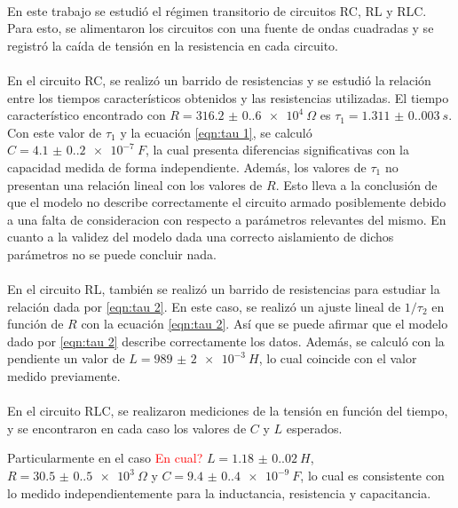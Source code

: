 \paragraph{}
En este trabajo se estudió el régimen transitorio de circuitos RC, RL y RLC. Para esto, se alimentaron los circuitos con una fuente de ondas cuadradas y se registró la caída de tensión en la resistencia en cada circuito.
\paragraph{}
En el circuito RC, se realizó un barrido de resistencias y se estudió la relación entre los tiempos característicos obtenidos y las resistencias utilizadas. El tiempo característico encontrado con $R=\SI{316.2(0.6)e4}{\Omega}$ es $\tau_1=\SI{1.311(0.003)}{s}$. Con este valor de $\tau_1$ y la ecuación \eqref{eqn:tau 1}, se calculó $C=\SI{4.1(0.2)e-7}{F}$, la cual presenta diferencias significativas con la capacidad medida de forma independiente. Además, los valores de $\tau_1$ no presentan una relación lineal con los valores de $R$. Esto lleva a la conclusión de que el modelo no describe correctamente el circuito armado posiblemente debido a una falta de consideracion con respecto a parámetros relevantes del mismo. En cuanto a la validez del modelo dada una correcto aislamiento de dichos parámetros no se puede concluir nada.
\paragraph{}
En el circuito RL, también se realizó un barrido de resistencias para estudiar la relación dada por \eqref{eqn:tau 2}. En este caso, se realizó un ajuste lineal de $1/\tau_2$ en función de $R$ con la ecuación \eqref{eqn:tau 2}. Así que se puede afirmar que el modelo dado por \eqref{eqn:tau 2} describe correctamente los datos. Además, se calculó con la pendiente un valor de $L=\SI{989(2)e-3}{H}$, lo cual coincide con el valor medido previamente. 
\paragraph{}
En el circuito RLC, se realizaron mediciones de la tensión en función del tiempo, y se encontraron en cada caso los valores de $C$ y $L$ esperados. 



Particularmente en el caso \textcolor{red}{En cual?} $L = \SI{1.18(0.02)}{H}$, $R = \SI{30.5(0.5)e3}{\Omega}$ y $C = \SI{9.4(0.4)e-9}{F}$, lo cual es consistente con lo medido independientemente para la inductancia, resistencia y capacitancia.

